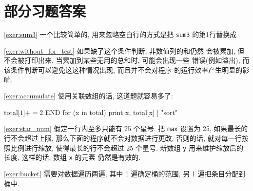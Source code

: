 \chapter{部分习题答案}
\label{chap:answers_to_selected_exercises}

\myexer\ref{exer:sum3} 一个比较简单的, 用来忽略空白行的方式是把 \texttt{sum3}
的第1行替换成
\begin{awkcode}
        nfld == 0 && NF > 0 { nfld = NF
\end{awkcode}

\myexer\ref{exer:without_for_test} 如果缺了这个条件判断, 非数值列的和仍然
    会被累加, 但不会被打印出来. 当累加到某些无用的总和时, 可能会出现一些
    错误(例如溢出), 而该条件判断可以避免这这种情况出现, 而且并不会对程序
    的运行效率产生明显的影响.

\myexer\ref{exer:accumulate} 使用关联数组的话, 这道题就容易多了:
\begin{awkcode}
        { total[$1] += $2 }
    END { for (x in total) print x, total[x] | "sort" }
\end{awkcode}

\myexer\ref{exer:star_num} 假定一行内至多只能有 25 个星号. 把 \texttt{max} 
设置为 25, 如果最长的行不会超过上限, 那么下面的程序就不会对数据进行更改,
    否则的话, 就对每一行按照比例进行缩放, 使得最长的行不会超过 25 个星号.
新数组 \texttt{y} 用来维护缩放后的长度, 这样的话, 数组 \texttt{x} 的元素
仍然是有效的.

\myexer\ref{exer:bucket} 需要对数据遍历两遍, 其中 1 遍确定桶的范围, 另 1 
    遍把条目分配到桶中.
    
